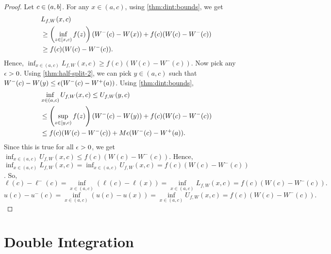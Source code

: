 \documentclass[a4paper,12pt,fleqn]{article}
\begin{document}
\begin{proof}
Let $c \in (a, b]$.
For any $x \in (a, c)$, using \cref{thm:dint:bounds}, we get
\begin{align*}
& L_{f,W}(x, c)
\\ &\ge \left(\inf_{z \in [x, c)} f(z)\right)(W^-(c)-W(x)) + f(c)(W(c)-W^-(c))
\\ &\ge f(c)(W(c)-W^-(c)).
\end{align*}
Hence, $\inf_{x \in (a, c)} L_{f,W}(x, c) \ge f(c)(W(c)-W^-(c))$.
Now pick any $\epsilon > 0$.
Using \cref{thm:half-split-2}, we can pick $y \in (a, c)$
such that $W^-(c) - W(y) \le \epsilon(W^-(c)-W^+(a))$.
Using \cref{thm:dint:bounds},
\begin{align*}
& \inf_{x \in (a, c)} U_{f,W}(x, c) \le U_{f,W}(y, c)
\\ &\le \left(\sup_{z \in [y, c)} f(z)\right)(W^-(c)-W(y)) + f(c)(W(c)-W^-(c))
\\ &\le f(c)(W(c)-W^-(c)) + M\epsilon(W^-(c)-W^+(a)).
\end{align*}
Since this is true for all $\epsilon > 0$, we get
$\inf_{x \in (a, c)} U_{f,W}(x, c) \le f(c)(W(c)-W^-(c))$.
Hence, $\inf_{x \in (a, c)} L_{f,W}(x, c) = \inf_{x \in (a, c)} U_{f,W}(x, c) = f(c)(W(c)-W^-(c))$.
So,
\[ \ell(c) - \ell^-(c) = \inf_{x \in (a, c)} (\ell(c) - \ell(x))
    = \inf_{x \in (a, c)} L_{f,W}(x, c) = f(c)(W(c)-W^-(c)). \]
\[ u(c) - u^-(c) = \inf_{x \in (a, c)} (u(c) - u(x))
    = \inf_{x \in (a, c)} U_{f,W}(x, c) = f(c)(W(c)-W^-(c)). \]
\end{proof}

\section{Double Integration}
\end{document}
